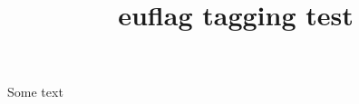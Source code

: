 \documentclass{article}
\title{euflag tagging test}
\begin{document}
Some text \euflag
\end{document}
